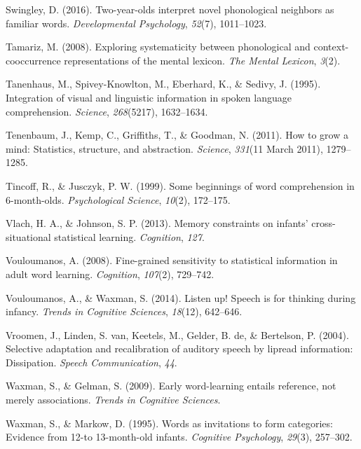 \documentclass[english,floatsintext,man]{apa6}
\theoremstyle{definition}
\theoremstyle{definition}
\theoremstyle{definition}
\theoremstyle{remark}
\begin{document}
\hypertarget{ref-Swingley2016}{}
Swingley, D. (2016). Two-year-olds interpret novel phonological
neighbors as familiar words. \emph{Developmental Psychology},
\emph{52}(7), 1011--1023.

\hypertarget{ref-Tamariz2008}{}
Tamariz, M. (2008). Exploring systematicity between phonological and
context-cooccurrence representations of the mental lexicon. \emph{The
Mental Lexicon}, \emph{3}(2).

\hypertarget{ref-Tanenhaus1995}{}
Tanenhaus, M., Spivey-Knowlton, M., Eberhard, K., \& Sedivy, J. (1995).
Integration of visual and linguistic information in spoken language
comprehension. \emph{Science}, \emph{268}(5217), 1632--1634.

\hypertarget{ref-tenenbaum11}{}
Tenenbaum, J., Kemp, C., Griffiths, T., \& Goodman, N. (2011). How to
grow a mind: Statistics, structure, and abstraction. \emph{Science},
\emph{331}(11 March 2011), 1279--1285.

\hypertarget{ref-tincoff1999}{}
Tincoff, R., \& Jusczyk, P. W. (1999). Some beginnings of word
comprehension in 6-month-olds. \emph{Psychological Science},
\emph{10}(2), 172--175.

\hypertarget{ref-vlach2013}{}
Vlach, H. A., \& Johnson, S. P. (2013). Memory constraints on infants'
cross-situational statistical learning. \emph{Cognition}, \emph{127}.

\hypertarget{ref-vouloumanos2008}{}
Vouloumanos, A. (2008). Fine-grained sensitivity to statistical
information in adult word learning. \emph{Cognition}, \emph{107}(2),
729--742.

\hypertarget{ref-vouloumanos2014}{}
Vouloumanos, A., \& Waxman, S. (2014). Listen up! Speech is for thinking
during infancy. \emph{Trends in Cognitive Sciences}, \emph{18}(12),
642--646.

\hypertarget{ref-vroomen2004}{}
Vroomen, J., Linden, S. van, Keetels, M., Gelder, B. de, \& Bertelson,
P. (2004). Selective adaptation and recalibration of auditory speech by
lipread information: Dissipation. \emph{Speech Communication},
\emph{44}.

\hypertarget{ref-waxman2009}{}
Waxman, S., \& Gelman, S. (2009). Early word-learning entails reference,
not merely associations. \emph{Trends in Cognitive Sciences}.

\hypertarget{ref-waxman1995}{}
Waxman, S., \& Markow, D. (1995). Words as invitations to form
categories: Evidence from 12-to 13-month-old infants. \emph{Cognitive
Psychology}, \emph{29}(3), 257--302.
\end{document}
